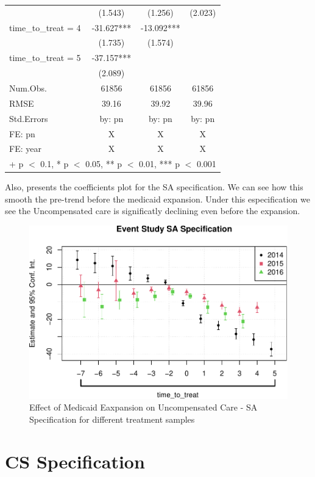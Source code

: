 \documentclass[
  12pt,
]{article}
\begin{document}
\begin{table}
\begin{tabular}[t]{lccc}
 & (1.543) & (1.256) & (2.023)\\
time\_to\_treat = 4 & -31.627*** & -13.092*** & \\
 & (1.735) & (1.574) & \\
time\_to\_treat = 5 & -37.157*** &  & \\
 & (2.089) &  & \\
\midrule
Num.Obs. & 61856 & 61856 & 61856\\
RMSE & 39.16 & 39.92 & 39.96\\
Std.Errors & by: pn & by: pn & by: pn\\
FE: pn & X & X & X\\
FE: year & X & X & X\\
\bottomrule
\multicolumn{4}{l}{\rule{0pt}{1em}+ p $<$ 0.1, * p $<$ 0.05, ** p $<$ 0.01, *** p $<$ 0.001}\\
\end{tabular}
\end{table}

Also,  presents the coefficients plot for the SA
specification. We can see how this smooth the pre-trend before the
medicaid expansion. Under this especification we see the Uncompensated
care is significatly declining even before the expansion.

\begin{figure}
\centering
\includegraphics{Report_files/figure-latex/Fig-4-1.pdf}
\caption{Effect of Medicaid Eaxpansion on Uncompensated Care - SA
Specification for different treatment samples}
\end{figure}

\newpage

\hypertarget{cs-specification}{%
\section{CS Specification}\label{cs-specification}}
\end{document}
